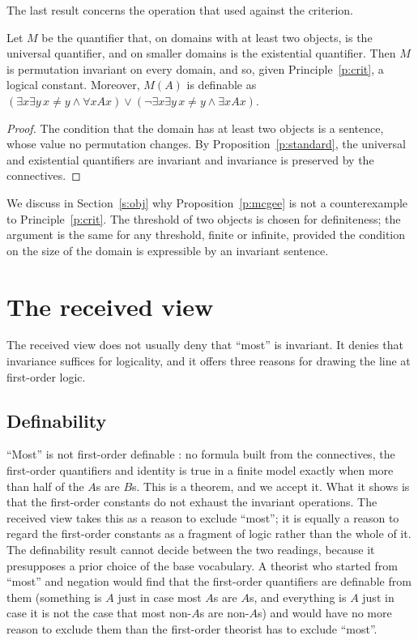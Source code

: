 \documentclass{situationist-preprint}
\begin{document}
The last result concerns the operation that \citet{McGee1996} used against the criterion.

\begin{proposition}\label{p:mcgee}
Let $M$ be the quantifier that, on domains with at least two objects, is the universal quantifier, and on smaller domains is the existential quantifier. Then $M$ is permutation invariant on every domain, and so, given Principle~\ref{p:crit}, a logical constant. Moreover, $M(A)$ is definable as $(\exists x \exists y\, x \neq y \wedge \forall x A x) \vee (\neg \exists x \exists y\, x \neq y \wedge \exists x A x)$.
\end{proposition}

\begin{proof}
The condition that the domain has at least two objects is a sentence, whose value no permutation changes. By Proposition~\ref{p:standard}, the universal and existential quantifiers are invariant and invariance is preserved by the connectives.
\end{proof}

We discuss in Section~\ref{s:obj} why Proposition~\ref{p:mcgee} is not a counterexample to Principle~\ref{p:crit}. The threshold of two objects is chosen for definiteness; the argument is the same for any threshold, finite or infinite, provided the condition on the size of the domain is expressible by an invariant sentence.

\section{The received view}\label{s:received}

The received view does not usually deny that \enquote{most} is invariant. It denies that invariance suffices for logicality, and it offers three reasons for drawing the line at first-order logic.

\subsection{Definability}

\enquote{Most} is not first-order definable \citep{BarwiseCooper1981}: no formula built from the connectives, the first-order quantifiers and identity is true in a finite model exactly when more than half of the $A$s are $B$s. This is a theorem, and we accept it. What it shows is that the first-order constants do not exhaust the invariant operations. The received view takes this as a reason to exclude \enquote{most}; it is equally a reason to regard the first-order constants as a fragment of logic rather than the whole of it. The definability result cannot decide between the two readings, because it presupposes a prior choice of the base vocabulary. A theorist who started from \enquote{most} and negation would find that the first-order quantifiers are definable from them (something is $A$ just in case most $A$s are $A$s, and everything is $A$ just in case it is not the case that most non-$A$s are non-$A$s) and would have no more reason to exclude them than the first-order theorist has to exclude \enquote{most}.
\end{document}
